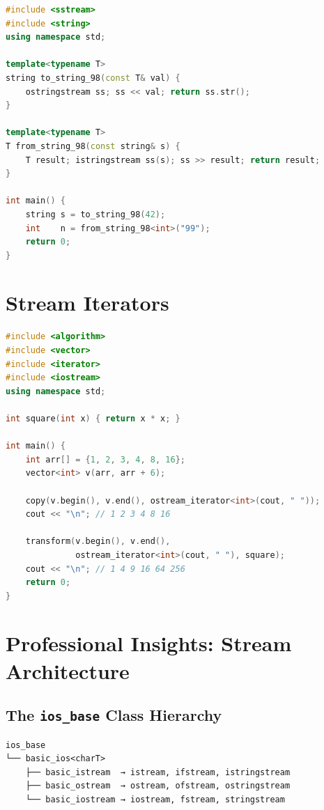 \begin{lstlisting}[language=C++, caption={C++98 number-to-string idiom}]
#include <sstream>
#include <string>
using namespace std;

template<typename T>
string to_string_98(const T& val) {
    ostringstream ss; ss << val; return ss.str();
}

template<typename T>
T from_string_98(const string& s) {
    T result; istringstream ss(s); ss >> result; return result;
}

int main() {
    string s = to_string_98(42);
    int    n = from_string_98<int>("99");
    return 0;
}
\end{lstlisting}

\section{Stream Iterators}
\label{sec:stream-iterators}

\begin{lstlisting}[language=C++, caption={ostream\_iterator with algorithms}]
#include <algorithm>
#include <vector>
#include <iterator>
#include <iostream>
using namespace std;

int square(int x) { return x * x; }

int main() {
    int arr[] = {1, 2, 3, 4, 8, 16};
    vector<int> v(arr, arr + 6);

    copy(v.begin(), v.end(), ostream_iterator<int>(cout, " "));
    cout << "\n"; // 1 2 3 4 8 16

    transform(v.begin(), v.end(),
              ostream_iterator<int>(cout, " "), square);
    cout << "\n"; // 1 4 9 16 64 256
    return 0;
}
\end{lstlisting}

\section{Professional Insights: Stream Architecture}
\label{sec:stream-architecture}

\subsection{The \texttt{ios\_base} Class Hierarchy}

\begin{lstlisting}[language={}, caption={iostream class hierarchy}]
ios_base
└── basic_ios<charT>
    ├── basic_istream  → istream, ifstream, istringstream
    ├── basic_ostream  → ostream, ofstream, ostringstream
    └── basic_iostream → iostream, fstream, stringstream
\end{lstlisting}

